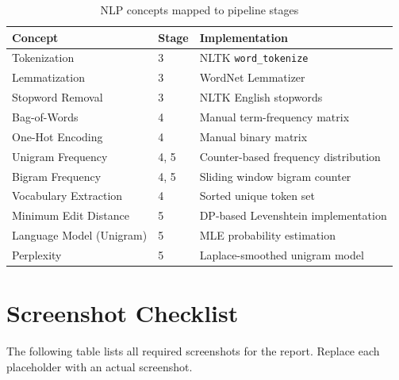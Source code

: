 \documentclass[12pt,a4paper]{article}
\begin{document}
\begin{table}[H]
\centering
\begin{tabular}{@{}lll@{}}
\toprule
\textbf{Concept} & \textbf{Stage} & \textbf{Implementation} \\ \midrule
Tokenization              & 3 & NLTK \texttt{word\_tokenize} \\
Lemmatization              & 3 & WordNet Lemmatizer \\
Stopword Removal           & 3 & NLTK English stopwords \\
Bag-of-Words               & 4 & Manual term-frequency matrix \\
One-Hot Encoding           & 4 & Manual binary matrix \\
Unigram Frequency          & 4, 5 & Counter-based frequency distribution \\
Bigram Frequency           & 4, 5 & Sliding window bigram counter \\
Vocabulary Extraction      & 4 & Sorted unique token set \\
Minimum Edit Distance      & 5 & DP-based Levenshtein implementation \\
Language Model (Unigram)   & 5 & MLE probability estimation \\
Perplexity                 & 5 & Laplace-smoothed unigram model \\
\bottomrule
\end{tabular}
\caption{NLP concepts mapped to pipeline stages}
\end{table}

\section{Screenshot Checklist}

The following table lists all required screenshots for the report. Replace each placeholder with an actual screenshot.
\end{document}
